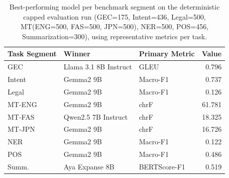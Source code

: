 \begin{table}[t]
\centering
\caption{Best-performing model per benchmark segment on the deterministic capped evaluation run (GEC=175, Intent=436, Legal=500, MT(ENG=500, FAS=500, JPN=500), NER=500, POS=456, Summarization=300), using representative metrics per task.}
\label{tab:capped-task-winners}
\begin{tabular}{lllr}
\toprule
Task Segment & Winner & Primary Metric & Value \\
\midrule
GEC & Llama 3.1 8B Instruct & GLEU & 0.796 \\
Intent & Gemma2 9B & Macro-F1 & 0.737 \\
Legal & Gemma2 9B & Macro-F1 & 0.126 \\
MT-ENG & Gemma2 9B & chrF & 61.781 \\
MT-FAS & Qwen2.5 7B Instruct & chrF & 18.325 \\
MT-JPN & Gemma2 9B & chrF & 16.726 \\
NER & Gemma2 9B & Macro-F1 & 0.122 \\
POS & Gemma2 9B & Macro-F1 & 0.486 \\
Summ. & Aya Expanse 8B & BERTScore-F1 & 0.519 \\
\bottomrule
\end{tabular}
\end{table}

